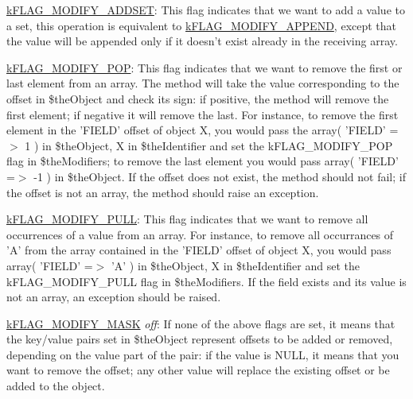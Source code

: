\begin{DoxyItemize}
\begin{DoxyItemize}
\begin{DoxyItemize}
\begin{DoxyItemize}
\item \hyperlink{}{k\-F\-L\-A\-G\-\_\-\-M\-O\-D\-I\-F\-Y\-\_\-\-A\-D\-D\-S\-E\-T}\-: This flag indicates that we want to add a value to a set, this operation is equivalent to \hyperlink{}{k\-F\-L\-A\-G\-\_\-\-M\-O\-D\-I\-F\-Y\-\_\-\-A\-P\-P\-E\-N\-D}, except that the value will be appended only if it doesn't exist already in the receiving array. 
\item \hyperlink{}{k\-F\-L\-A\-G\-\_\-\-M\-O\-D\-I\-F\-Y\-\_\-\-P\-O\-P}\-: This flag indicates that we want to remove the first or last element from an array. The method will take the value corresponding to the offset in {\ttfamily \$the\-Object} and check its sign\-: if positive, the method will remove the first element; if negative it will remove the last. For instance, to remove the first element in the '{\ttfamily F\-I\-E\-L\-D}' offset of object {\ttfamily X}, you would pass the {\ttfamily array( 'F\-I\-E\-L\-D' =$>$ 1 )} in {\ttfamily \$the\-Object}, {\ttfamily X} in {\ttfamily \$the\-Identifier} and set the k\-F\-L\-A\-G\-\_\-\-M\-O\-D\-I\-F\-Y\-\_\-\-P\-O\-P flag in {\ttfamily \$the\-Modifiers}; to remove the last element you would pass {\ttfamily array( 'F\-I\-E\-L\-D' =$>$ -\/1 )} in {\ttfamily \$the\-Object}. If the offset does not exist, the method should not fail; if the offset is not an array, the method should raise an exception. 
\item \hyperlink{}{k\-F\-L\-A\-G\-\_\-\-M\-O\-D\-I\-F\-Y\-\_\-\-P\-U\-L\-L}\-: This flag indicates that we want to remove all occurrences of a value from an array. For instance, to remove all occurrances of '{\ttfamily A}' from the array contained in the '{\ttfamily F\-I\-E\-L\-D}' offset of object {\ttfamily X}, you would pass {\ttfamily array( 'F\-I\-E\-L\-D' =$>$ 'A' )} in {\ttfamily \$the\-Object}, {\ttfamily X} in {\ttfamily \$the\-Identifier} and set the k\-F\-L\-A\-G\-\_\-\-M\-O\-D\-I\-F\-Y\-\_\-\-P\-U\-L\-L flag in {\ttfamily \$the\-Modifiers}. If the field exists and its value is not an array, an exception should be raised. 
\item \hyperlink{}{k\-F\-L\-A\-G\-\_\-\-M\-O\-D\-I\-F\-Y\-\_\-\-M\-A\-S\-K} {\itshape off}\-: If none of the above flags are set, it means that the key/value pairs set in {\ttfamily \$the\-Object} represent offsets to be added or removed, depending on the value part of the pair\-: if the value is {\ttfamily N\-U\-L\-L}, it means that you want to remove the offset; any other value will replace the existing offset or be added to the object. 
\end{DoxyItemize}

\end{DoxyItemize}
\end{DoxyItemize}
\end{DoxyItemize}
